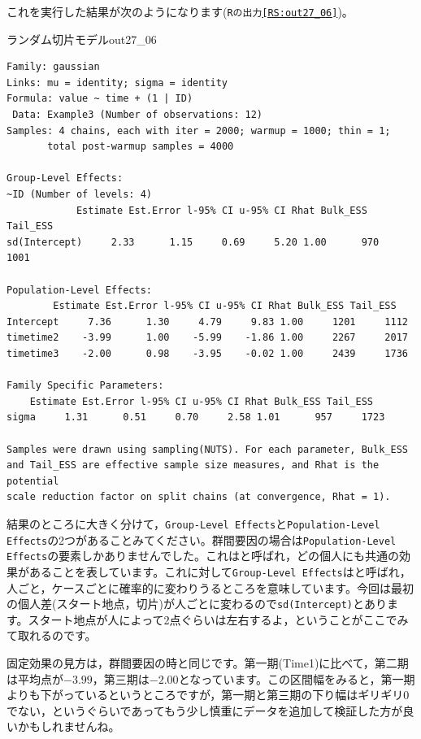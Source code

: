 \documentclass{ltjbook}
\begin{document}
これを実行した結果が次のようになります(\texttt{Rの出力\ref{RS:out27_06}})。
\begin{Rscreen}{ランダム切片モデル}{out27_06}
	\begin{verbatim}
Family: gaussian 
Links: mu = identity; sigma = identity 
Formula: value ~ time + (1 | ID) 
 Data: Example3 (Number of observations: 12) 
Samples: 4 chains, each with iter = 2000; warmup = 1000; thin = 1;
       total post-warmup samples = 4000

Group-Level Effects: 
~ID (Number of levels: 4) 
            Estimate Est.Error l-95% CI u-95% CI Rhat Bulk_ESS Tail_ESS
sd(Intercept)     2.33      1.15     0.69     5.20 1.00      970     1001

Population-Level Effects: 
        Estimate Est.Error l-95% CI u-95% CI Rhat Bulk_ESS Tail_ESS
Intercept     7.36      1.30     4.79     9.83 1.00     1201     1112
timetime2    -3.99      1.00    -5.99    -1.86 1.00     2267     2017
timetime3    -2.00      0.98    -3.95    -0.02 1.00     2439     1736

Family Specific Parameters: 
    Estimate Est.Error l-95% CI u-95% CI Rhat Bulk_ESS Tail_ESS
sigma     1.31      0.51     0.70     2.58 1.01      957     1723

Samples were drawn using sampling(NUTS). For each parameter, Bulk_ESS
and Tail_ESS are effective sample size measures, and Rhat is the potential
scale reduction factor on split chains (at convergence, Rhat = 1).
\end{verbatim}
\end{Rscreen}
結果のところに大きく分けて，\texttt{Group-Level Effects}と\texttt{Population-Level Effects}の2つがあることみてください。群間要因の場合は\texttt{Population-Level Effects}の要素しかありませんでした。これはと呼ばれ，どの個人にも共通の効果があることを表しています。これに対して\texttt{Group-Level Effects}はと呼ばれ，人ごと，ケースごとに確率的に変わりうるところを意味しています。今回は最初の個人差(スタート地点，切片)が人ごとに変わるので\texttt{sd(Intercept)}とあります。スタート地点が人によって2点ぐらいは左右するよ，ということがここでみて取れるのです。

固定効果の見方は，群間要因の時と同じです。第一期(Time1)に比べて，第二期は平均点が$-3.99$，第三期は$-2.00$となっています。この区間幅をみると，第一期よりも下がっているというところですが，第一期と第三期の下り幅はギリギリ0でない，というぐらいであってもう少し慎重にデータを追加して検証した方が良いかもしれませんね。\\
\end{document}
